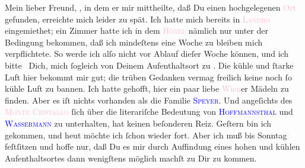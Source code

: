 \pstart{}Mein lieber Freund,\pend
\pstart
           \label{K_L03077-44v}\label{K_L03077-44h}, in dem er mir mittheilte, daß Du einen hochgelegenen \textcolor{pink}{Ort}{}\ledrightnote{{$\rightarrow$}\textcolor{pink}{Klobenstein}} gefunden, erreichte mich
               leider zu spät. Ich hatte mich bereits in \textsc{\textcolor{pink}{Landro}{}\ledrightnote{\textcolor{pink}{Höhlenstein}}} eingemiethet; ein Zimmer hatte ich in dem \textsc{\textcolor{pink}{Hôtel}{}\ledrightnote{{$\rightarrow$}\textcolor{pink}{Hotel Baur}}} nämlich nur \strikeout{\textcolor{gray}{×}\-\textcolor{gray}{×}} unter der Bedingung bekommen, daß ich mindeſtens eine Woche zu bleiben mich
               verpflichtete. So werde ich alſo nicht vor Ablauf dieſer Woche \label{K_L03077-1v}\label{K_L03077-1h} können, und ich bitte  Dich, mich ſogleich von Deinem Aufenthaltsort zu
                  \label{K_L03077-11v}\label{K_L03077-11h}. Die kühle und
               ſtarke Luft hier bekommt mir gut; die trüben Gedanken vermag freilich keine noch ſo
               kühle Luft zu bannen. Ich hatte gehofft, hier ein paar liebe \textcolor{pink}{Wien}{}\ledrightnote{\textcolor{pink}{Wien}}er Mädeln zu finden. Aber es iſt nichts vorhanden als die
               Familie {\pb}\textsc{\textcolor{blue}{Speyer}{}\ledrightnote{\textcolor{blue}{Nanette Speyer}{\newline}\textcolor{blue}{Albert Speyer}}}. Und angeſichts des \textsc{\textcolor{pink}{Monte Cristallo}{}\ledrightnote{\textcolor{pink}{Monte Cristallo}}} ſich über die literariſche Bedeutung von \textsc{\textcolor{blue}{Hoffmannsthal}{}\ledrightnote{\textcolor{blue}{Hugo von Hofmannsthal}}} und \textsc{\textcolor{blue}{Wassermann}{}\ledrightnote{\textcolor{blue}{Jakob Wassermann}}} zu unterhalten, hat keinen beſonderen Reiz. Geſtern bin ich gekommen, und heut möchte
               ich ſchon wieder fort. Aber ich muß bis Sonntag
               feſtſitzen und hoffe nur, daß Du es mir durch Auffindung eines hohen und kühlen
               Aufenthaltsortes dann wenigſtens möglich\strikeout{\textcolor{gray}{ſt}} machſt zu Dir zu kommen.\pend
           
